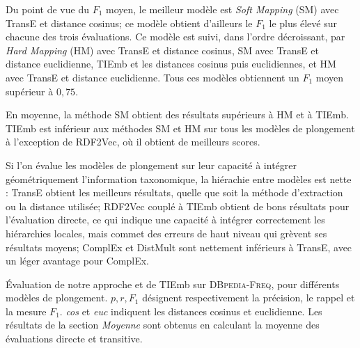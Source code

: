 Du point de vue du $F_1$ moyen, le meilleur modèle est \textit{Soft Mapping} (SM) avec TransE et distance cosinus; ce modèle obtient d'ailleurs le $F_1$ le plus élevé sur chacune des trois évaluations. Ce modèle est suivi, dans l'ordre décroissant, par \textit{Hard Mapping} (HM) avec TransE et distance cosinus, SM avec TransE et distance euclidienne, TIEmb et les distances cosinus puis euclidiennes, et HM avec TransE et distance euclidienne. Tous ces modèles obtiennent un $F_1$ moyen supérieur à $0,75$.

En moyenne, la méthode SM obtient des résultats supérieurs à HM et à TIEmb. TIEmb est inférieur aux méthodes SM et HM sur tous les modèles de plongement à l'exception de RDF2Vec, où il obtient de meilleurs scores. 



Si l'on évalue les modèles de plongement sur leur capacité à intégrer géométriquement l'information taxonomique, la hiérachie entre modèles est nette : TransE obtient les meilleurs résultats, quelle que soit la méthode d'extraction ou la distance utilisée; RDF2Vec couplé à TIEmb obtient de bons résultats pour l'évaluation directe, ce qui indique une capacité à intégrer correctement les hiérarchies locales, mais commet des erreurs de haut niveau qui grèvent ses résultats moyens; ComplEx et DistMult sont nettement inférieurs à TransE, avec un léger avantage pour ComplEx.



\begin{table}
    \centering
    \caption[Évaluation de trois méthodes d'extraction de taxonomie]{
    Évaluation de notre approche et de TIEmb sur \textsc{DBpedia-Freq}, pour différents modèles de plongement. $p, r, F_1$ désignent respectivement la précision, le rappel et la mesure $F_1$. \textit{cos} et \textit{euc} indiquent les distances cosinus et euclidienne. Les résultats de la section \textit{Moyenne} sont obtenus en calculant la moyenne des évaluations directe et transitive.}
    \begin{adjustwidth}{-1in}{-1in}
        \begin{center}
            
            \label{tab:te-results} 
        \end{center}
    \end{adjustwidth}
\end{table}




